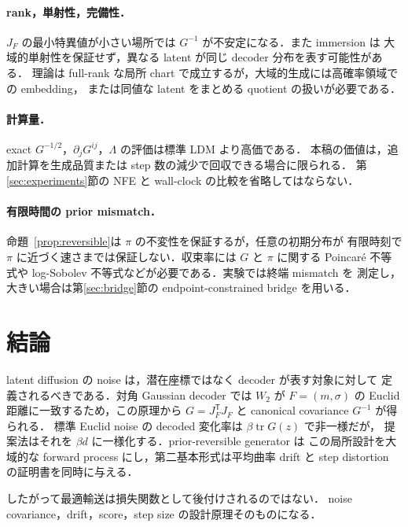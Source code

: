 \documentclass[uplatex,dvipdfmx,11pt,a4paper]{jsarticle}
\begin{document}
\paragraph{rank，単射性，完備性．}
$J_F$ の最小特異値が小さい場所では $G^{-1}$ が不安定になる．また immersion は
大域的単射性を保証せず，異なる latent が同じ decoder 分布を表す可能性がある．
理論は full-rank な局所 chart で成立するが，大域的生成には高確率領域での embedding，
または同値な latent をまとめる quotient の扱いが必要である．

\paragraph{計算量．}
exact $G^{-1/2}$，$\partial_jG^{ij}$，$\Lambda$ の評価は標準 LDM より高価である．
本稿の価値は，追加計算を生成品質または step 数の減少で回収できる場合に限られる．
第\ref{sec:experiments}節の NFE と wall-clock の比較を省略してはならない．

\paragraph{有限時間の prior mismatch．}
命題~\ref{prop:reversible}は $\pi$ の不変性を保証するが，任意の初期分布が
有限時刻で $\pi$ に近づく速さまでは保証しない．収束率には $G$ と $\pi$ に関する
Poincar\'e 不等式や log-Sobolev 不等式などが必要である．実験では終端 mismatch を
測定し，大きい場合は第\ref{sec:bridge}節の endpoint-constrained bridge を用いる．

\section{結論}

latent diffusion の noise は，潜在座標ではなく decoder が表す対象に対して
定義されるべきである．対角 Gaussian decoder では $W_2$ が
$F=(m,\sigma)$ の Euclid 距離に一致するため，この原理から
$G=J_F^{\mathsf T}J_F$ と canonical covariance $G^{-1}$ が得られる．
標準 Euclid noise の decoded 変化率は $\beta\operatorname{tr}G(z)$ で非一様だが，
提案法はそれを $\beta d$ に一様化する．prior-reversible generator は
この局所設計を大域的な forward process にし，第二基本形式は平均曲率 drift と
step distortion の証明書を同時に与える．

したがって最適輸送は損失関数として後付けされるのではない．
noise covariance，drift，score，step size の設計原理そのものになる．
\end{document}
